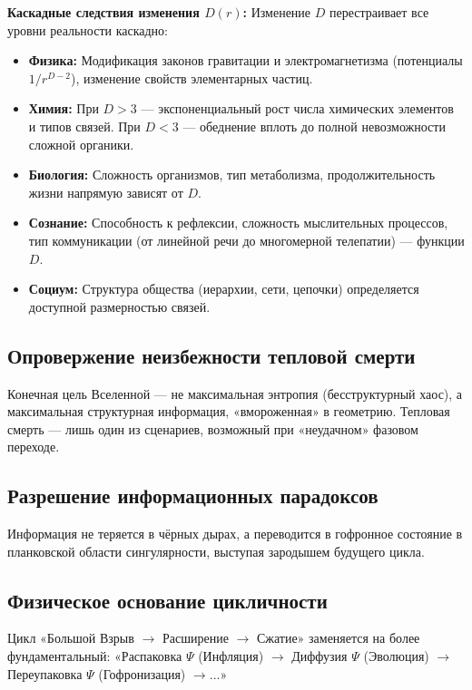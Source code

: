 \documentclass[a4paper,12pt]{article}
\begin{document}
\textbf{Каскадные следствия изменения $D(r)$:} Изменение $D$ перестраивает все уровни реальности каскадно:
\begin{itemize}
	\item \textbf{Физика:} Модификация законов гравитации и электромагнетизма (потенциалы $1/r^{D-2}$), изменение свойств элементарных частиц.
	\item \textbf{Химия:} При $D > 3$ — экспоненциальный рост числа химических элементов и типов связей. При $D < 3$ — обеднение вплоть до полной невозможности сложной органики.
	\item \textbf{Биология:} Сложность организмов, тип метаболизма, продолжительность жизни напрямую зависят от $D$.
	\item \textbf{Сознание:} Способность к рефлексии, сложность мыслительных процессов, тип коммуникации (от линейной речи до многомерной телепатии) — функции $D$.
	\item \textbf{Социум:} Структура общества (иерархии, сети, цепочки) определяется доступной размерностью связей.
\end{itemize}

\subsection{Опровержение неизбежности тепловой смерти}

Конечная цель Вселенной — не максимальная энтропия (бесструктурный хаос), а максимальная структурная информация, «вмороженная» в геометрию. Тепловая смерть — лишь один из сценариев, возможный при «неудачном» фазовом переходе.

\subsection{Разрешение информационных парадоксов}

Информация не теряется в чёрных дырах, а переводится в гофронное состояние в планковской области сингулярности, выступая зародышем будущего цикла.

\subsection{Физическое основание цикличности}

Цикл «Большой Взрыв $\to$ Расширение $\to$ Сжатие» заменяется на более фундаментальный: «Распаковка $\Psi$ (Инфляция) $\to$ Диффузия $\Psi$ (Эволюция) $\to$ Переупаковка $\Psi$ (Гофронизация) $\to \dots$»
\end{document}
